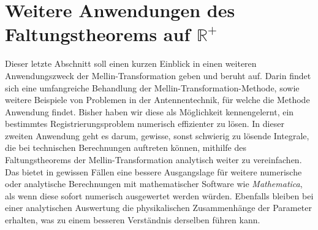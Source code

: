%
%
%

\section{Weitere Anwendungen des Faltungstheorems auf $\mathbb{R^+}$
\label{mellin:section:teil5}}
Dieser letzte Abschnitt soll einen kurzen Einblick in einen 
weiteren Anwendungszweck der Mellin-Transformation geben und 
beruht auf\cite{mellin:mellin-transform-method}.
Darin findet sich eine umfangreiche Behandlung der 
Mellin-Transformation-Methode, sowie weitere Beispiele 
von Problemen in der Antennentechnik, für welche die Methode 
Anwendung findet.
Bisher haben wir diese als Möglichkeit kennengelernt, ein 
bestimmtes Registrierungsproblem numerisch effizienter zu lösen.
In dieser zweiten Anwendung geht es darum, gewisse, sonst schwierig 
zu lösende Integrale, die bei technischen Berechnungen auftreten 
können, mithilfe des Faltungstheorems der Mellin-Transformation 
analytisch weiter zu vereinfachen.
Das bietet in gewissen Fällen eine bessere Ausgangslage für weitere 
numerische oder analytische Berechnungen mit mathematischer Software 
wie {\em Mathematica}, als wenn diese sofort numerisch ausgewertet 
werden würden.
Ebenfalls bleiben bei einer analytischen Auswertung die physikalischen 
Zusammenhänge der Parameter erhalten, was zu einem besseren Verständnis 
derselben führen kann.


